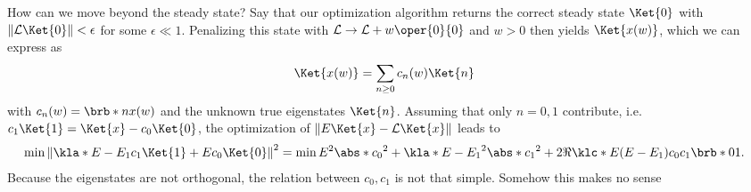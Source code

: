 \documentclass[english, parskip=full]{scrartcl}
\begin{document}
How can we move beyond the steady state?
Say that our optimization algorithm returns the correct steady state $\Ket{0}$ with $\|\mathcal{L}\Ket{0}\| < \epsilon$ for some $\epsilon\ll 1$.
Penalizing this state with $\mathcal{L} \rightarrow \mathcal{L} + w\oper{0}{0}$ and $w>0$ then yields $\Ket{x(w)}$, which we can express as
\begin{align}
\Ket{x(w)} &= \sum_{n\ge 0} c_n(w) \Ket{n}
\end{align}
with $c_n(w) = \brb*{n}{x(w)}$ and the unknown true eigenstates $\Ket{n}$.
Assuming that only $n=0,1$ contribute, i.e. $c_1\Ket{1} = \Ket{x} - c_0\Ket{0}$, the optimization of $\| E\Ket{x} - \mathcal{L}\Ket{x} \|$ leads to
\begin{align}
\min \left\| \kla*{E - E_1}c_1 \Ket{1} + Ec_0\Ket{0} \right\|^2 &= \min E^2\abs*{c_0}^2 + \kla*{E-E_1}^2\abs*{c_1}^2 + 2\Re\klc*{E(E-E_1)c_0c_1\brb*{0}{1}}.
\end{align}
Because the eigenstates are not orthogonal, the relation between $c_0,c_1$ is not that simple.
Somehow this makes no sense
\end{document}
